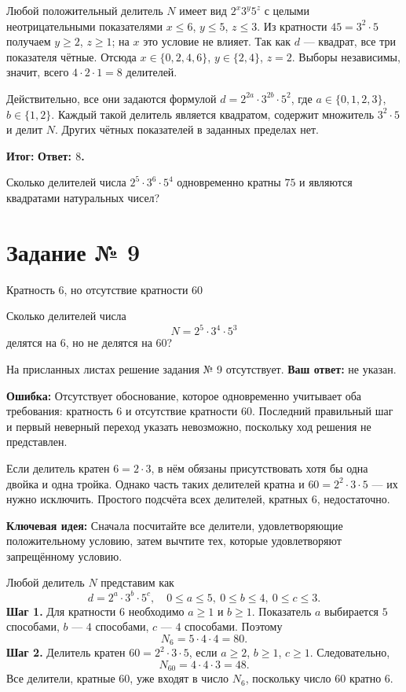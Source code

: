 \documentclass[a4paper,11pt]{article}
\newcommand{\subhead}[1]{\par\vspace{3pt}{\bfseries\textcolor{ink}{#1}}\par\vspace{1pt}}
\newcommand{\errorlabel}{\textcolor{warn}{\textbf{Ошибка:}}}
\newcommand{\keylabel}{\textcolor{keyblue}{\textbf{Ключевая идея:}}}
\newcommand{\finallabel}{\textcolor{accent}{\textbf{Итог:}}}
\newcommand{\tasktitle}[2]{\phantomsection\label{task:#1}\section*{Задание № #1}\textcolor{muted}{#2}\par\vspace{4pt}}
\begin{document}
{\subhead{Полное правильное решение}
Любой положительный делитель $N$ имеет вид $2^x3^y5^z$ с целыми неотрицательными показателями $x\le6$, $y\le5$, $z\le3$. Из кратности $45=3^2\cdot5$ получаем $y\ge2$, $z\ge1$; на $x$ это условие не влияет. Так как $d$ --- квадрат, все три показателя чётные. Отсюда $x\in\{0,2,4,6\}$, $y\in\{2,4\}$, $z=2$. Выборы независимы, значит, всего $4\cdot2\cdot1=8$ делителей.

\subhead{Проверка}
Действительно, все они задаются формулой $d=2^{2a}\cdot3^{2b}\cdot5^2$, где $a\in\{0,1,2,3\}$, $b\in\{1,2\}$. Каждый такой делитель является квадратом, содержит множитель $3^2\cdot5$ и делит $N$. Других чётных показателей в заданных пределах нет.

\finallabel{} \textbf{Ответ: $8$.}

\subhead{Задача на закрепление}
Сколько делителей числа $2^5\cdot3^6\cdot5^4$ одновременно кратны $75$ и являются квадратами натуральных чисел?
}
\clearpage
\tasktitle{9}{Кратность 6, но отсутствие кратности 60}
\subhead{Текст задания}
Сколько делителей числа
\[
N=2^5\cdot3^4\cdot5^3
\]
делятся на $6$, но не делятся на $60$?

\subhead{Ваше решение и ответ}
На присланных листах решение задания № 9 отсутствует. \textbf{Ваш ответ:} не указан.

\subhead{Где именно возникает затруднение}
\errorlabel{} Отсутствует обоснование, которое одновременно учитывает оба требования: кратность $6$ и отсутствие кратности $60$. Последний правильный шаг и первый неверный переход указать невозможно, поскольку ход решения не представлен.

\subhead{Почему важно учитывать оба условия}
Если делитель кратен $6=2\cdot3$, в нём обязаны присутствовать хотя бы одна двойка и одна тройка. Однако часть таких делителей кратна и $60=2^2\cdot3\cdot5$ --- их нужно исключить. Простого подсчёта всех делителей, кратных $6$, недостаточно.

\subhead{Ключевая идея и исправление}
\keylabel{} Сначала посчитайте все делители, удовлетворяющие положительному условию, затем вычтите тех, которые удовлетворяют запрещённому условию.

\subhead{Полное правильное решение}
Любой делитель $N$ представим как
\[
d=2^a\cdot3^b\cdot5^c,\quad
0\le a\le5,\ 0\le b\le4,\ 0\le c\le3.
\]
\textbf{Шаг 1.} Для кратности $6$ необходимо $a\ge1$ и $b\ge1$. Показатель $a$ выбирается $5$ способами, $b$ --- $4$ способами, $c$ --- $4$ способами. Поэтому
\[
N_6=5\cdot4\cdot4=80.
\]
\textbf{Шаг 2.} Делитель кратен $60=2^2\cdot3\cdot5$, если $a\ge2$, $b\ge1$, $c\ge1$. Следовательно,
\[
N_{60}=4\cdot4\cdot3=48.
\]
Все делители, кратные $60$, уже входят в число $N_6$, поскольку число $60$ кратно $6$.
\end{document}
